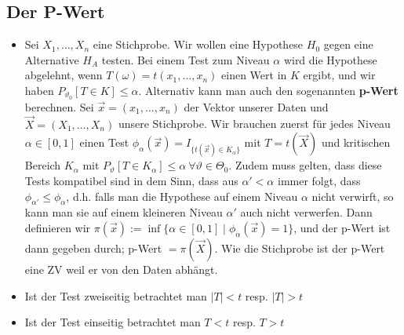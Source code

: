 \subsection{Der P-Wert}
\begin{itemize}
    \item Sei $X_1, \dots, X_n$ eine Stichprobe. Wir wollen eine Hypothese $H_0$ gegen eine Alternative $H_A$ testen. Bei einem Test zum Niveau $\alpha$ wird die Hypothese abgelehnt, wenn $T(\omega) = t(x_1, \dots, x_n)$ einen Wert in $K$ ergibt, und wir haben $P_{\vartheta_0} [T \in K] \le \alpha$. Alternativ kann man auch den sogenannten \textbf{p-Wert} berechnen. Sei $\overrightarrow{x} = (x_1, \dots, x_n)$ der Vektor unserer Daten und $\overrightarrow{X} = (X_1, \dots, X_n)$ unsere Stichprobe. Wir brauchen zuerst für jedes Niveau $\alpha \in [0, 1]$ einen Test $\phi_\alpha(\overrightarrow{x}) = I_{\{t(\overrightarrow{x}) \in K_\alpha\} }$ mit $T = t(\overrightarrow{X})$ und kritischen Bereich $K_\alpha$ mit $P_\vartheta[T \in K_\alpha] \le \alpha \ \forall \vartheta \in \Theta_0$. Zudem muss gelten, dass diese Tests kompatibel sind in dem Sinn, dass aus $\alpha' < \alpha$ immer folgt, dass $\phi_{\alpha'} \le \phi_\alpha$, d.h. falls man die Hypothese auf einem Niveau $\alpha$ nicht verwirft, so kann man sie auf einem kleineren Niveau $\alpha'$ auch nicht verwerfen. Dann definieren wir $\pi(\overrightarrow{x}) := \inf \{\alpha \in [0, 1] \mid \phi_\alpha(\overrightarrow{x}) = 1\}$, und der p-Wert ist dann gegeben durch; p-Wert $= \pi(\overrightarrow{X})$. Wie die Stichprobe ist der p-Wert eine ZV weil er von den Daten abhängt. 
    \item Ist der Test zweiseitig betrachtet man $|T| < t$ resp. $|T| > t$ 
    \item Ist der Test einseitig betrachtet man $T < t$ resp. $T > t$
\end{itemize}

